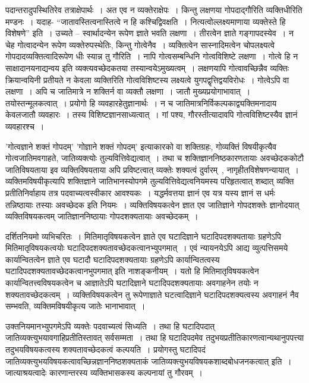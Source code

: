 \begin{small}
					पदान्तरादुपस्थितिरेव तत्राक्षेपार्थः~। अत एव न व्यक्तेराक्षेपः~। किन्तु लक्षणया गोपदाद्गौरिति व्यक्तिधीरिति मण्डनः~। यदाह- “जातावस्तित्वनास्तित्वे न हि कश्चिद्विवक्षति~। नित्यत्वोल्लक्ष्यमाणाया व्यक्तेस्ते हि विशेषणे” इति~। उच्यते – स्वार्थादन्येन रूपेण ज्ञाते भवति लक्षणा~। तीरत्वेन ज्ञाते गङ्गापदस्येव~। न चेह गोत्वादन्येन रूपेण व्यक्तेरुपस्थेतिः, किन्तु गोत्वेनैव~। व्यक्तित्वेन सास्नादिमत्वेन चोपलक्ष्यत्वे गोपदादव्यक्तित्वादिरूपेण धीः स्यान्न तु गौरिति~। नापि गोत्वसम्बन्धिनि गोत्वविशिष्टे लक्षणा~। गोत्वे हि न साक्षादानयनाद्यन्वय इति व्यक्त्यवच्छेदकतया तस्यान्वयेऽमुख्यत्वम्~। लक्षणयापि गोत्वावच्छिन्नैव व्यक्तिः क्रियान्वयिनी प्रतीयते न केवला व्यक्तिरिति गोत्वविशिष्टस्य लक्ष्यत्वे युगपद्वृत्तिद्वयविरोधः~। गोत्वेऽपि वा लक्षणा~। अपि च जातिमात्रे न शक्तिर्न वा व्यक्तौ लक्षणा~। जातौ मुख्यप्रयोगाभावात्~। तयोस्तन्मूलकत्वात्~। प्रयोगो हि व्यवहारहेतुज्ञानार्थः~। न च जातिमात्रनिर्विकल्पकाद्व्यक्तिमनादाय केवलजातौ व्यवहारः~। तस्य विशिष्टज्ञानसाध्यत्वात्~। गां पश्य, गौरस्तीत्यादावपि गोत्वविशिष्टस्यैव ज्ञानं व्यवहारश्च~। 
				\end{small}

				'गोत्वज्ञाने शक्तं गोपदम्' 'गोज्ञाने शक्तं गोपदम्' इत्याकारको वा शक्तिग्रहः, गोव्यक्तिं विषयीकृत्यैव गोत्वजातिमवगाहते, जातिव्यक्त्योः तुल्यवित्तिवेद्यत्वात्~। तथा च शक्तिज्ञाननिष्ठकारणतायाः अवच्छेदककोटौ जातिविषयताया इव व्यक्तिविषयताया अपि प्रविष्टत्वात् व्यक्तेः शक्यत्वं दुर्वारम्~, नागृहीतविशेषणन्यायात्~। व्यक्तिमविषयीकृत्यापि शक्तिज्ञाने जातिभानस्योपगमे तुल्यवित्तिवेद्यत्वनियमस्य परिहृतत्वात् शब्दात् व्यक्ति प्रतीतिनिर्वाहाय तत्र पदवाच्यत्वस्वीकार आवश्यकः~। यद्धर्मवत्तया ज्ञानं एव यत्र यस्य ज्ञानं स धर्मः तन्निष्ठायाः तस्याः अवच्छेदक इति नियमः~। व्यक्तिविषयकत्वेन ज्ञात एव जातिज्ञाने गोपदशक्तेः ज्ञानोदयात् व्यक्तिविषयकत्वम् जातिज्ञाननिष्ठायाः गोपदशक्यतायाः अवच्छेदकम्~। 

				दर्शितनियमो व्यभिचरितः~। मितिमातृविषयकत्वेन ज्ञाते एव घटादिज्ञाने घटादिपदशक्यतायाः ग्रहणेऽपि मितिमातृविषयकत्वयोः घटादिपदशक्यतावच्छेदकत्वानभ्युपगमात्~। एवं न्यायनयेऽपि आद्य व्युत्पत्तिसमये कार्यान्वितत्वेन ज्ञाते एव घटादौ घटादिपदशक्यतायाः ग्रहणेऽपि कार्यान्वितत्वस्य घटादिपदशक्यतावच्छेदकत्वानभुपगमात् इति नाशङ्कनीयम्~। यतो हि मितिमातृविषयकत्वेन कार्यान्वितत्त्वविषयकत्वेन च आज्ञातेऽपि घटादिज्ञाने घटादिपदशक्यतायाः अवगाहनेन तयोः न शक्यतावच्छेदकत्वम्~।  व्यक्तिविषयकत्वेन तु रूपेणाज्ञाते घटत्वादिज्ञाने घटादिपदशक्यत्वस्य अवगाहनं नैव सम्भवति, व्यक्तिमविषयीकृत्य जातेः भानाभावात्~। 

				उक्तनियमानभ्युपगमेऽपि व्यक्तेः पदवाच्यत्वं सिध्यति~। तथा हि घटादिपदात् जातिव्यक्त्युभयावगाहिप्रतीतिस्तावत् सर्वसम्मता~। तथा हि घटादिपदमेव तदुभयप्रतीतिकारणत्वान्यथानुपपत्त्या तदुभयविषयकत्वस्य शक्यतावच्छेदकत्वं कल्पयति~। प्रयोगस्तु घटादिपदं जातिव्यक्त्युभयविषयकत्वावच्छिन्नज्ञाननिष्ठशक्यताकं जातिव्यक्त्युभयविषयकशाब्दबोधजनकत्वात् इति~। जात्याश्रयत्वादेः कारणान्तरस्य व्यक्तिभासकस्य कल्पनायां तु गौरवम्~। 

